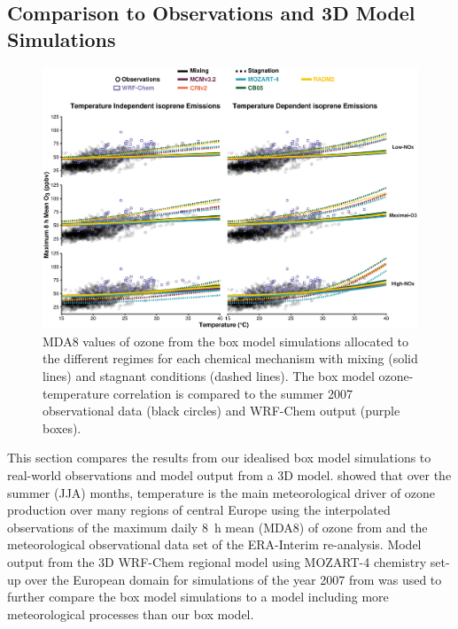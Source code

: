\subsection{Comparison to Observations and 3D Model Simulations} \label{ss:r_observations}
\begin{figure}[t]%
    \centering%
    \caption{MDA8 values of ozone from the box model simulations allocated to the different  regimes for each chemical mechanism with mixing (solid lines) and stagnant conditions (dashed lines). The box model ozone-temperature correlation is compared to the summer 2007 observational data (black circles) and WRF-Chem output (purple boxes).}%
    \label{f:comparison}%
    \vspace{2mm}%
    \includegraphics[height=0.43\textheight]{img/Germany_O3-T_ERA_WRF_2007}%
\end{figure}

\begin{table}[t]%
    \centering%
    \caption{Slopes (m$_{\text{O3-T}}$, ppbv per \degree C) of the linear fit to MDA8 values of ozone and temperature correlations in Fig.~\ref{f:comparison}, indicating the increase of MDA8 in ppbv of ozone per \degree C. The slope of the observational data is $2.15$~ppbv/\degree C and the slope of the WRF-Chem output is $2.05$~ppbv/\degree C.}%
    \label{t:mo3-t}%
    \vspace{2mm}
    \vspace{-4mm}
\end{table} 

This section compares the results from our idealised box model simulations to real-world observations and model output from a 3D model.
\citet{Otero:2016} showed that over the summer (JJA) months, temperature is the main meteorological driver of ozone production over many regions of central Europe using the interpolated observations of the maximum daily 8~h mean (MDA8) of ozone from \citet{Schnell:2015} and the meteorological observational data set of the ERA-Interim re-analysis.
Model output from the 3D WRF-Chem regional model using MOZART-4 chemistry set-up over the European domain for simulations of the year 2007 from \citet{Mar:2016} was used to further compare the box model simulations to a model including more meteorological processes than our box model.

